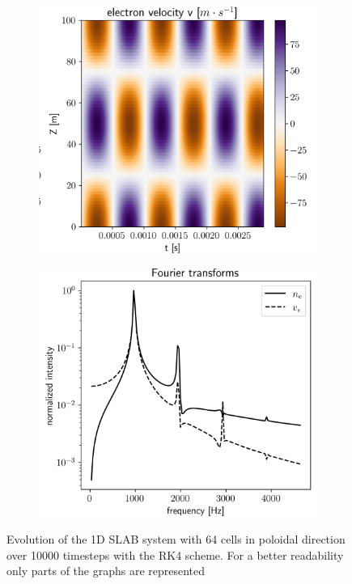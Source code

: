 \begin{figure}[H]
\begin{subfigure}[b]{0.32\textwidth}
		\includegraphics[width=1\textwidth]{schemes/AdvectionSLAB_1D_timeplot_ve.png}
		\label{fig:AdvectionSLAB_velocityEvolution}
	\end{subfigure}
	\begin{subfigure}[b]{0.32\textwidth}
		\centering
		\includegraphics[width=1\textwidth]{schemes/AdvectionSLAB_FFT.png}
		\label{fig:AdvectionSLAB_FFT}
	\end{subfigure}
	\caption{Evolution of the 1D SLAB system with 64 cells in poloidal direction over 10000 timesteps with the RK4 scheme. For a better readability only parts of the graphs are represented}
	\label{fig:AdvectionSLAB}
\end{figure}

